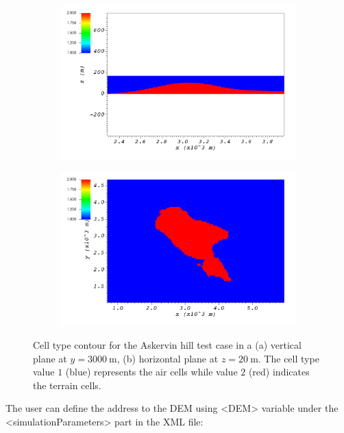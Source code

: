 \begin{figure}[H]
    \begin{subfigure}{\textwidth}
    \centering
    \includegraphics[width=13.0cm,keepaspectratio]{Images/askervein_y_3000_icell.png}
    \caption{}
    \end{subfigure}
    \begin{subfigure}{\textwidth}
    \centering
    \includegraphics[width=13.0cm,keepaspectratio]{Images/askervein_z_20_icell.png}
    \caption{}
    \end{subfigure}
    \caption{Cell type contour for the Askervin hill test case in a (a) vertical plane at $y=3000\ \si{\meter}$, (b) horizontal plane at $z=20\ \si{\meter}$. The cell type value $1$ (blue) represents the air cells while value $2$ (red) indicates the terrain cells.}
\end{figure}

The user can define the address to the DEM using <DEM> variable under the <simulationParameters> part in the XML file:

